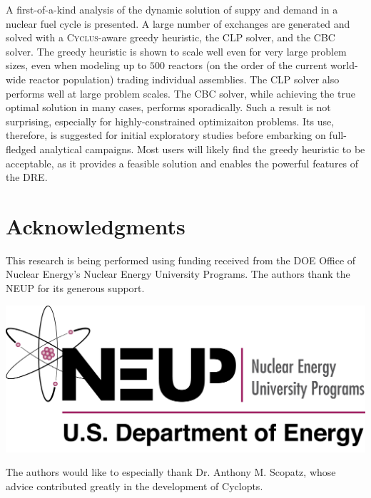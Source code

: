 \documentclass{anstrans}
\newcommand{\Cyclus}{\textsc{Cyclus}}
\begin{document}
A first-of-a-kind analysis of the dynamic solution of suppy and demand in a
nuclear fuel cycle is presented. A large number of exchanges are generated and
solved with a \Cyclus-aware greedy heuristic, the CLP solver, and the CBC
solver. The greedy heuristic is shown to scale well even for very large problem
sizes, even when modeling up to $500$ reactors (on the order of the current
world-wide reactor population) trading individual assemblies. The CLP solver
also performs well at large problem scales. The CBC solver, while achieving the
true optimal solution in many cases, performs sporadically. Such a result is not
surprising, especially for highly-constrained optimizaiton problems. Its use,
therefore, is suggested for initial exploratory studies before embarking on
full-fledged analytical campaigns. Most users will likely find the greedy
heuristic to be acceptable, as it provides a feasible solution and enables the
powerful features of the DRE.


\section{Acknowledgments}

This research is being performed using funding received from the DOE
Office of Nuclear Energy's Nuclear Energy University Programs.  The
authors thank the NEUP for its generous support.

\begin{center}
\includegraphics[width=.25\columnwidth]{neup_logo_large.jpg}
\end{center}

The authors would like to especially thank Dr. Anthony M. Scopatz, whose advice
contributed greatly in the development of Cyclopts.



\end{document}

